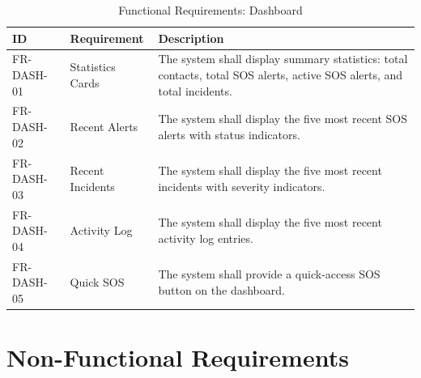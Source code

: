 \begin{table}[H]
  \centering
  \caption{Functional Requirements: Dashboard}
  \label{tab:fr-dashboard}
  \begin{tabularx}{\textwidth}{@{}l l X@{}}
    \toprule
    \textbf{ID} & \textbf{Requirement} & \textbf{Description} \\
    \midrule
    FR-DASH-01 & Statistics Cards & The system shall display summary statistics: total contacts, total SOS alerts, active SOS alerts, and total incidents. \\
    FR-DASH-02 & Recent Alerts & The system shall display the five most recent SOS alerts with status indicators. \\
    FR-DASH-03 & Recent Incidents & The system shall display the five most recent incidents with severity indicators. \\
    FR-DASH-04 & Activity Log & The system shall display the five most recent activity log entries. \\
    FR-DASH-05 & Quick SOS & The system shall provide a quick-access SOS button on the dashboard. \\
    \bottomrule
  \end{tabularx}
\end{table}

\section{Non-Functional Requirements}

